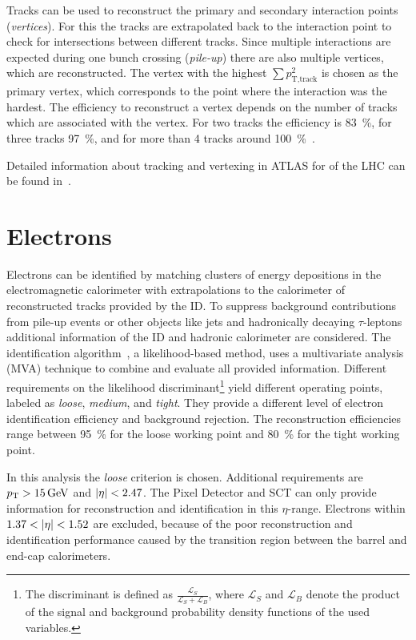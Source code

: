 Tracks can be used to reconstruct the primary and secondary interaction points (\emph{vertices}).
For this the tracks are extrapolated back to the interaction point to check for intersections between different tracks.
Since multiple interactions are expected during one bunch crossing (\emph{pile-up}) there are also multiple vertices, which
are reconstructed.
The vertex with the highest $\sum p_{\text{T},\text{track}}^2$ is chosen as the primary vertex, which corresponds to the
point where the interaction was the hardest.
The efficiency to reconstruct a vertex depends on the number of tracks which are associated with the vertex.
For two tracks the efficiency is \SI{83}{\percent}, for three tracks \SI{97}{\percent}, and for more than 4 tracks around \SI{100}{\percent}~\cite{ATL-PHYS-PUB-2015-026}.

Detailed information about tracking and vertexing in ATLAS for \runtwo{} of the LHC
can be found in~\cite{ATL-PHYS-PUB-2015-051,ATL-PHYS-PUB-2015-006,ATL-PHYS-PUB-2015-026}.


\section{Electrons}\label{sec:object_selection:electrons}

Electrons can be identified by matching clusters of energy depositions in the electromagnetic calorimeter with
extrapolations to the calorimeter of reconstructed tracks provided by the ID\@.
To suppress background contributions from pile-up events or other objects like jets and hadronically decaying $\tau$-leptons
additional information of the ID and hadronic calorimeter are considered.
The identification algorithm~\cite{ATLAS-CONF-2016-024}, a likelihood-based method, uses a multivariate analysis (MVA) technique to
combine and evaluate all provided information.
Different requirements on the likelihood discriminant\footnote{The discriminant is defined as
$\frac{\mathcal{L}_S}{\mathcal{L}_S + \mathcal{L}_B}$, where $\mathcal{L}_S$ and $\mathcal{L}_B$ denote the product of
the signal and background probability density functions of the used variables.} yield different operating points,
labeled as  \emph{loose}, \emph{medium}, and \emph{tight}.
They provide a different level of electron identification efficiency and background rejection.
The reconstruction efficiencies range between \SI{95}{\percent} for the loose working point and \SI{80}{\percent} for the tight working point.

In this analysis the \emph{loose} criterion is chosen.
Additional requirements are $\pt > \SI{15}{\GeV}$ and $\left|\eta\right| < 2.47$.
The Pixel Detector and SCT can only provide information for reconstruction and identification in this $\eta$-range.
Electrons within $1.37 < \left|\eta\right| < 1.52$ are excluded, because of the poor reconstruction and identification
performance caused by the transition region between the barrel and end-cap calorimeters.

